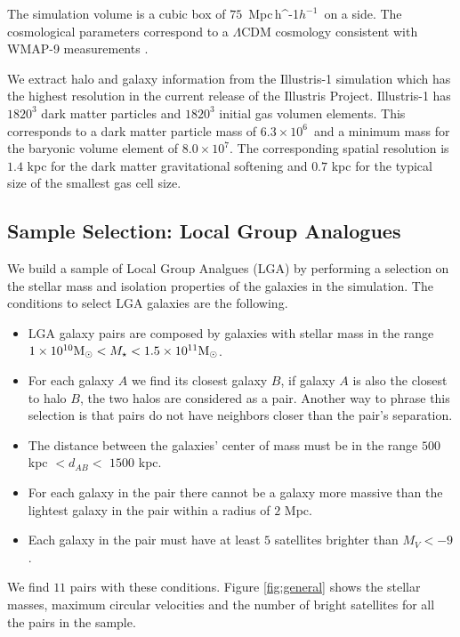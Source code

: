 \documentclass[a4paper,fleqn,usenatbib]{mnras}
\newcommand{\Mpch}{\,{\rm Mpc}\,\ifmmode h^{-1}\else $h^{-1}$\fi}
\newcommand{\Msun}{{\ifmmode{{\rm{M_{\odot}}}}\else{${\rm{M_{\odot}}}$}\fi}}
\begin{document}
The simulation volume is a cubic box of $75$ \Mpch\ on a side.
The cosmological parameters correspond to a $\Lambda$CDM cosmology
consistent with WMAP-9 measurements \citep{2013ApJS..208...19H}. 

We extract halo and galaxy information from the Illustris-1 simulation
which has the highest resolution in the current release of the
Illustris Project.
Illustris-1 has $1820^3$ dark matter particles and $1820^3$ initial gas
volumen elements. 
This corresponds to a dark matter particle mass of
$6.3\times 10^6$\Msun\ and a minimum mass for the baryonic volume
element of $8.0\times 10^7$\Msun. 
The corresponding spatial resolution is $1.4$ kpc for the dark matter
gravitational softening and $0.7$ kpc for the typical size of the
smallest gas cell size. 

 

\subsection{Sample Selection: Local Group Analogues}

We build a sample of Local Group Analgues (LGA) by performing a selection on
the stellar mass and isolation properties of the galaxies in the
simulation. The conditions to select LGA galaxies are the following.

\begin{itemize}
\item LGA galaxy pairs are composed by galaxies with stellar mass in the
range $1\times10^{10}\Msun <M_{\star}<1.5 \times 10^{11} \Msun$.
\item For each galaxy $A$ we find its closest galaxy $B$, if galaxy $A$ is also
the closest to halo $B$, the two halos are considered as a pair. 
Another way to phrase this selection is that pairs do not have
neighbors closer than the pair's separation.
\item The distance between the galaxies' center of
  mass must be in the range $500$ kpc $<d_{AB}<$ $1500$ kpc. 
\item For each galaxy in the pair there cannot be a galaxy more
  massive than the lightest galaxy in the pair within a radius of $2$
  Mpc. 
\item Each galaxy in the pair must have at least $5$ satellites
  brighter than  $M_V<-9$.
\end{itemize}

We find $11$ pairs with these conditions.
Figure \ref{fig:general} shows the stellar masses, maximum circular
velocities and the number of bright satellites for all the pairs in
the sample.
\end{document}
